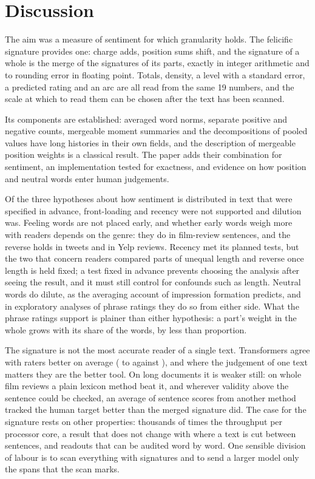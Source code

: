 \dialParagraphs

\section{Discussion}

The aim was a measure of sentiment for which granularity holds. The felicific signature provides one: charge adds, position sums shift, and the signature of a whole is the merge of the signatures of its parts, exactly in integer arithmetic and to rounding error in floating point. Totals, density, a level with a standard error, a predicted rating and an arc are all read from the same 19 numbers, and the scale at which to read them can be chosen after the text has been scanned.

Its components are established: averaged word norms\cite{dodds2011}, separate positive and negative counts\cite{tausczik2010,golder2011}, mergeable moment summaries\cite{cormode2009,pebay2008} and the decompositions of pooled values\cite{olley1996,kitagawa1955} have long histories in their own fields, and the description of mergeable position weights is a classical result\cite{anselone1964,szekelyhidi1982}. The paper adds their combination for sentiment, an implementation tested for exactness, and evidence on how position and neutral words enter human judgements.

Of the three hypotheses about how sentiment is distributed in text that were specified in advance, front-loading and recency were not supported and dilution was. Feeling words are not placed early, and whether early words weigh more with readers depends on the genre: they do in film-review sentences, and the reverse holds in tweets and in Yelp reviews. Recency met its planned tests, but the two that concern readers compared parts of unequal length and reverse once length is held fixed; a test fixed in advance prevents choosing the analysis after seeing the result, and it must still control for confounds such as length. Neutral words do dilute, as the averaging account of impression formation predicts\cite{anderson1965,nisbett1981}, and in exploratory analyses of phrase ratings they do so from either side. What the phrase ratings support is plainer than either hypothesis: a part's weight in the whole grows with its share of the words, by less than proportion.

The signature is not the most accurate reader of a single text. Transformers agree with raters better on average (\meanDistil{} to \meanRoberta{} against \meanSgw), and where the judgement of one text matters they are the better tool. On long documents it is weaker still: on whole film reviews a plain lexicon method beat it, and wherever validity above the sentence could be checked, an average of sentence scores from another method tracked the human target better than the merged signature did. The case for the signature rests on other properties: thousands of times the throughput per processor core, a result that does not change with where a text is cut between sentences, and readouts that can be audited word by word. One sensible division of labour is to scan everything with signatures and to send a larger model only the spans that the scan marks.


